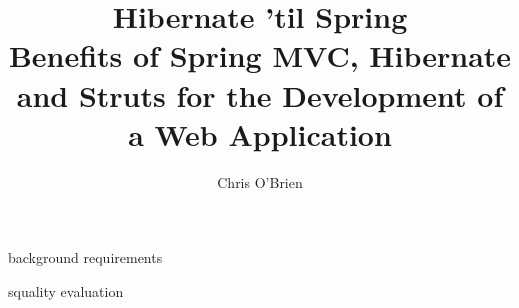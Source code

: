 \documentclass[a4paper,10pt,fleqn]{report}
\begin{document}
\title{Hibernate 'til Spring \\ Benefits of Spring MVC, Hibernate and Struts for the Development of a Web Application}
\author{Chris O'Brien}
\maketitle

\begin{abstract}      

\end{abstract}        

%
%
\tableofcontents

%
%
\listoffigures

%
%
\listoftables


 {background}
 {requirements}


 {squality}
 {evaluation}





  
\end{document}
